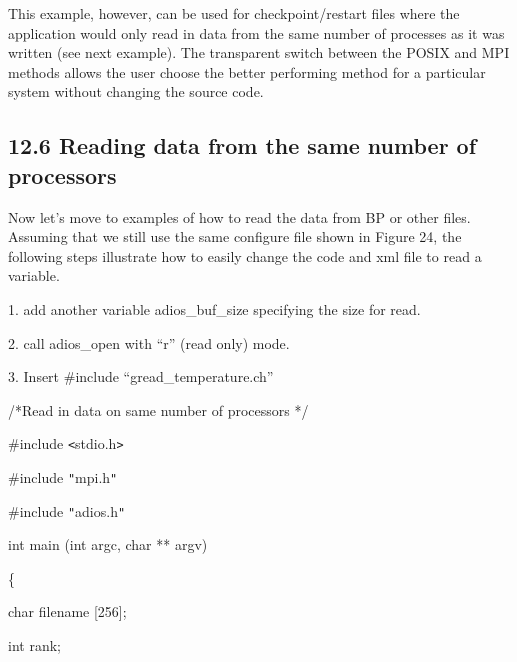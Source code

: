 \vspace{10pt}
This example, however, can be used for checkpoint/restart files where the application 
would only read in data from the same number of processes as it was written (see 
next example). The transparent switch between the POSIX and MPI methods allows 
the user choose the better performing method for a particular system without changing 
the source code. \label{HToc84890297}\label{HToc212016673}\label{HToc212016915}\label{HToc182553445}

\vspace{10pt}
\subsection*{{\large 12.6 }{\large \textbf{Reading data from the same number of 
processors}}}

\vspace{10pt}
Now let's move to examples of how to read the data from BP or other files.  Assuming 
that we still use the same configure file shown in Figure 24, the following steps 
illustrate how to easily change the code and xml file to read a variable. 

\vspace{10pt}
1. add another variable adios\_buf\_size specifying the size for read.

\vspace{10pt}
2. call adios\_open with ``r'' (read only) mode.

\vspace{10pt}
3. Insert \#include ``gread\_temperature.ch''

\vspace{22pt}
/*Read in data on same number of processors */

\vspace{10pt}
\#include \texttt{<}stdio.h\texttt{>}

\vspace{10pt}
\#include \texttt{"}mpi.h\texttt{"}

\vspace{10pt}
\#include \texttt{"}adios.h\texttt{"}

\vspace{10pt}
int main (int argc, char ** argv) 

\vspace{10pt}
\{

\vspace{10pt}
\leftskip=18pt
char      \textbf{    } filename [256];

\vspace{10pt}
int              rank;

